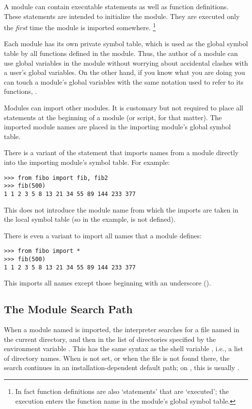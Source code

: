 \documentclass{manual}
\begin{document}
A module can contain executable statements as well as function
definitions.
These statements are intended to initialize the module.
They are executed only the
\emph{first}
time the module is imported somewhere.%
\footnote{
        In fact function definitions are also `statements' that are
        `executed'; the execution enters the function name in the
        module's global symbol table.
}

Each module has its own private symbol table, which is used as the
global symbol table by all functions defined in the module.
Thus, the author of a module can use global variables in the module
without worrying about accidental clashes with a user's global
variables.
On the other hand, if you know what you are doing you can touch a
module's global variables with the same notation used to refer to its
functions,
.

Modules can import other modules.
It is customary but not required to place all
statements at the beginning of a module (or script, for that matter).
The imported module names are placed in the importing module's global
symbol table.

There is a variant of the
statement that imports names from a module directly into the importing
module's symbol table.
For example:

\begin{verbatim}
>>> from fibo import fib, fib2
>>> fib(500)
1 1 2 3 5 8 13 21 34 55 89 144 233 377
\end{verbatim}

This does not introduce the module name from which the imports are taken
in the local symbol table (so in the example,  is not
defined).

There is even a variant to import all names that a module defines:

\begin{verbatim}
>>> from fibo import *
>>> fib(500)
1 1 2 3 5 8 13 21 34 55 89 144 233 377
\end{verbatim}

This imports all names except those beginning with an underscore
(\code{_}).

\subsection{The Module Search Path}
\label{searchPath}

When a module named  is imported, the interpreter searches
for a file named  in the current directory,
and then in the list of directories specified by
the environment variable .  This has the same syntax as
the shell variable , i.e., a list of
directory names.  When  is not set, or when the file
is not found there, the search continues in an installation-dependent
default path; on \UNIX{}, this is usually .
\end{document}
